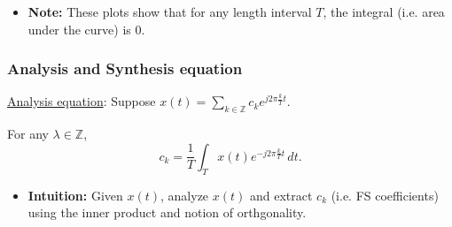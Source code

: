 \begin{derivation}
    \begin{center}
        \end{center}
    \begin{itemize}
        \item \textbf{Note:} These plots show that for any length interval $T$, the integral (i.e. area under the curve) is 0. 
    \end{itemize}
\end{derivation}

\subsubsection{Analysis and Synthesis equation}
\begin{definition}
    \underline{Analysis equation}: Suppose $x(t) = \sum_{k \in \mathbb{Z}} c_k e^{j 2\pi \frac{k}{T} t}$.

    For any $\lambda \in \mathbb{Z}$,
    \[
    c_k = \frac{1}{T} \int_T x(t) e^{-j 2\pi \frac{k}{T} t} \, dt.
    \]
    \begin{itemize}
        \item \textbf{Intuition:} Given $x(t)$, analyze $x(t)$ and extract $c_k$ (i.e. FS coefficients) using the inner product and notion of orthgonality.
    \end{itemize}
\end{definition}

